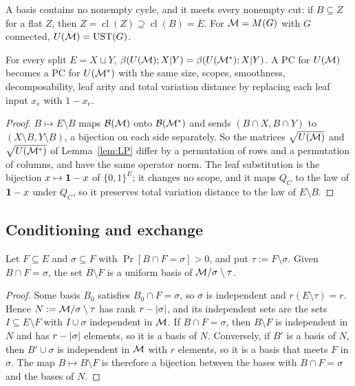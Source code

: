 A basis contains no nonempty cycle, and it meets every nonempty cut: if $B\subseteq Z$ for a flat $Z$, then $Z=\operatorname{cl}(Z)\supseteq\operatorname{cl}(B)=E$. For $\mathcal{M}=M(G)$ with $G$ connected, $U(\mathcal{M})=\mathrm{UST}(G)$.

\begin{proposition}[duality]\label{prop:mat-dual}
For every split $E=X\sqcup Y$, $\beta(U(\mathcal{M});X|Y)=\beta(U(\mathcal{M}^*);X|Y)$. A PC for $U(\mathcal{M})$ becomes a PC for $U(\mathcal{M}^*)$ with the same size, scopes, smoothness, decomposability, leaf arity and total variation distance by replacing each leaf input $x_e$ with $1-x_e$.
\end{proposition}

\begin{proof}
$B\mapsto E\setminus B$ maps $\mathcal{B}(\mathcal{M})$ onto $\mathcal{B}(\mathcal{M}^*)$ and sends $(B\cap X,B\cap Y)$ to $(X\setminus B,Y\setminus B)$, a bijection on each side separately. So the matrices $\sqrt{U(\mathcal{M})}$ and $\sqrt{U(\mathcal{M}^*)}$ of Lemma~\ref{lem:LP} differ by a permutation of rows and a permutation of columns, and have the same operator norm. The leaf substitution is the bijection $x\mapsto\mathbf{1}-x$ of $\{0,1\}^E$; it changes no scope, and it maps $Q_C$ to the law of $\mathbf{1}-x$ under $Q_C$, so it preserves total variation distance to the law of $E\setminus B$.
\end{proof}

\subsection{Conditioning and exchange}

\begin{lemma}\label{lem:mat-minor}
Let $F\subseteq E$ and $\sigma\subseteq F$ with $\Pr[B\cap F=\sigma]>0$, and put $\tau:=F\setminus\sigma$. Given $B\cap F=\sigma$, the set $B\setminus F$ is a uniform basis of $\mathcal{M}/\sigma\setminus\tau$.
\end{lemma}

\begin{proof}
Some basis $B_0$ satisfies $B_0\cap F=\sigma$, so $\sigma$ is independent and $r(E\setminus\tau)=r$. Hence $N:=\mathcal{M}/\sigma\setminus\tau$ has rank $r-\lvert \sigma\rvert$, and its independent sets are the sets $I\subseteq E\setminus F$ with $I\cup\sigma$ independent in $\mathcal{M}$. If $B\cap F=\sigma$, then $B\setminus F$ is independent in $N$ and has $r-\lvert \sigma\rvert$ elements, so it is a basis of $N$. Conversely, if $B'$ is a basis of $N$, then $B'\cup\sigma$ is independent in $\mathcal{M}$ with $r$ elements, so it is a basis that meets $F$ in $\sigma$. The map $B\mapsto B\setminus F$ is therefore a bijection between the bases with $B\cap F=\sigma$ and the bases of $N$.
\end{proof}

